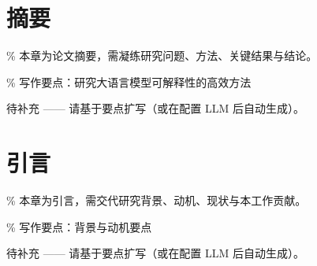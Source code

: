 \section{摘要}

\% 本章为论文摘要，需凝练研究问题、方法、关键结果与结论。

\% 写作要点：研究大语言模型可解释性的高效方法

待补充 —— 请基于要点扩写（或在配置 LLM 后自动生成）。

\section{引言}

\% 本章为引言，需交代研究背景、动机、现状与本工作贡献。

\% 写作要点：背景与动机要点

待补充 —— 请基于要点扩写（或在配置 LLM 后自动生成）。